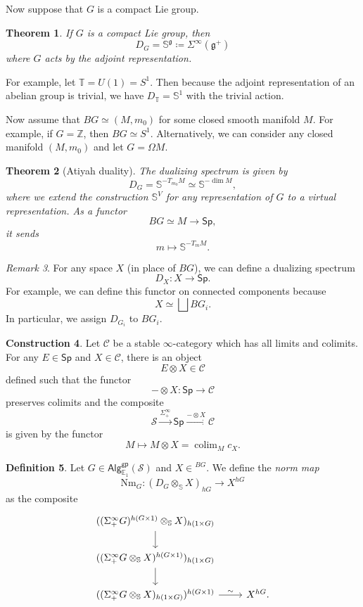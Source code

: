 \documentclass[10pt, oneside]{memoir}
\newtheorem{thm}{Theorem}[subsection]
\theoremstyle{definition}
\newtheorem{defn}[thm]{Definition}
\newtheorem{con}[thm]{Construction}
\theoremstyle{remark}
\newtheorem{rmk}[thm]{Remark}
\theoremstyle{plain}
\theoremstyle{definition}
\theoremstyle{remark}
\newcommand{\Z}{\mathbb{Z}}
\newcommand{\E}{\mathbb{E}}
\newcommand{\bS}{\mathbb{S}}
\newcommand{\g}{\mathfrak{g}}
\newcommand{\mc}[1]{\mathcal{#1}}
\newcommand{\T}{\mathbb{T}}
\newcommand{\mr}[1]{\mathrm{#1}}
\newcommand{\ms}[1]{\mathsf{#1}}
\newcommand{\1}{\mathbf{1}}
\newcommand{\2}{\mathbf{2}}
\newcommand{\3}{\mathbf{3}}
\DeclareMathOperator*{\colim}{colim}
\begin{document}
Now suppose that $G$ is a compact Lie group.
\begin{thm}
    If $G$ is a compact Lie group, then
    \[ D_G = \bS^{\g} \coloneqq \Sigma^{\infty}(\g^+) \]
    where $G$ acts by the adjoint representation.
\end{thm}

For example, let $\T = U(1) = S^1$. Then because the adjoint representation of an abelian group is trivial, we have $D_{\T} = \bS^1$ with the trivial action.

Now assume that $BG \simeq (M, m_0)$ for some closed smooth manifold $M$. For example, if $G = \Z$, then $BG \simeq S^1$. Alternatively, we can consider any closed manifold $(M, m_0)$ and let $G = \Omega M$.

\begin{thm}[Atiyah duality]
    The dualizing spectrum is given by
    \[ D_G = \bS^{-T_{m_0} M} \simeq \bS^{-\dim M}, \]
    where we extend the construction $\bS^V$ for any representation of $G$ to a virtual representation. As a functor
    \[ BG \simeq M \to \ms{Sp}, \]
    it sends 
    \[ m \mapsto \bS^{-T_m M}. \]
\end{thm}

\begin{rmk}
    For any space $X$ (in place of $BG$), we can define a dualizing spectrum
    \[ D_X \colon X \to \ms{Sp}. \]
    For example, we can define this functor on connected components because
    \[ X \simeq \bigsqcup B G_i. \]
    In particular, we assign $D_{G_i}$ to $BG_i$.
\end{rmk}

\begin{con}
    Let $\mc{C}$ be a stable $\infty$-category which has all limits and colimits. For any $E \in \ms{Sp}$ and $X \in \mc{C}$, there is an object
    \[ E \otimes X \in \mc{C} \]
    defined such that the functor
    \[ - \otimes X \colon \ms{Sp} \to \mc{C} \]
    preserves colimits and the composite
    \[ \mc{S} \xrightarrow{\Sigma_+^{\infty}} \ms{Sp} \xrightarrow{- \otimes X} \mc{C} \]
    is given by the functor
    \[ M \mapsto M \otimes X = \colim_M c_X. \]
\end{con}

\begin{defn}
    Let $G \in \ms{Alg}_{\E_1}^{\ms{gp}} (\mc{S})$ and $X \in \mc{}^{BG}$. We define the \textit{norm map}
    \[ \mr{Nm}_G \colon (D_G \otimes_{\bS} X)_{hG} \to X^{hG} \]
    as the composite
    \begin{equation*}
    \begin{tikzcd}
        ((\Sigma_+^{\infty} G)^{h(G\times 1)} \otimes_{\bS} X)_{h(1 \times G)} \ar{d} \\
        ((\Sigma_+^{\infty} G \otimes_{\bS} X)^{h(G \times 1)})_{h(1 \times G)} \ar{d} \\
        ((\Sigma_+^{\infty} G \otimes_{\bS} X)_{h(1 \times G)})^{h(G \times 1)} \ar{r}{\sim} & X^{hG}.
    \end{tikzcd}
    \end{equation*}
\end{defn}
\end{document}
